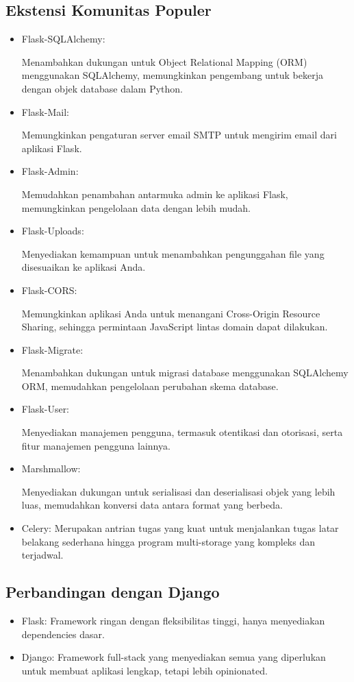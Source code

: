 \documentclass{article}
\begin{document}
\subsection{Ekstensi Komunitas Populer}
\begin{itemize}
    \item Flask-SQLAlchemy:

          Menambahkan dukungan untuk Object Relational Mapping (ORM) menggunakan SQLAlchemy, memungkinkan pengembang untuk bekerja dengan objek database dalam Python.
    \item Flask-Mail:

          Memungkinkan pengaturan server email SMTP untuk mengirim email dari aplikasi Flask.
    \item Flask-Admin:

          Memudahkan penambahan antarmuka admin ke aplikasi Flask, memungkinkan pengelolaan data dengan lebih mudah.
    \item Flask-Uploads:

          Menyediakan kemampuan untuk menambahkan pengunggahan file yang disesuaikan ke aplikasi Anda.
    \item Flask-CORS\@:

          Memungkinkan aplikasi Anda untuk menangani Cross-Origin Resource Sharing, sehingga permintaan JavaScript lintas domain dapat dilakukan.
    \item Flask-Migrate:

          Menambahkan dukungan untuk migrasi database menggunakan SQLAlchemy ORM, memudahkan pengelolaan perubahan skema database.
    \item Flask-User:

          Menyediakan manajemen pengguna, termasuk otentikasi dan otorisasi, serta fitur manajemen pengguna lainnya.
    \item Marshmallow:

          Menyediakan dukungan untuk serialisasi dan deserialisasi objek yang lebih luas, memudahkan konversi data antara format yang berbeda.
    \item Celery:
          Merupakan antrian tugas yang kuat untuk menjalankan tugas latar belakang sederhana hingga program multi-storage yang kompleks dan terjadwal.
\end{itemize}

\subsection{Perbandingan dengan Django}
\begin{itemize}
    \item Flask: Framework ringan dengan fleksibilitas tinggi, hanya menyediakan dependencies dasar.
    \item Django: Framework full-stack yang menyediakan semua yang diperlukan untuk membuat aplikasi lengkap, tetapi lebih opinionated.
\end{itemize}
\end{document}
